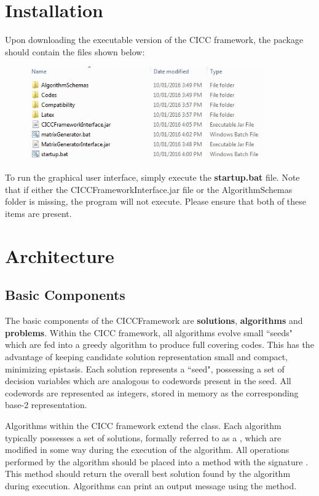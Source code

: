 \documentclass[titlepage]{article}
\begin{document}
\section{Installation}

Upon downloading the executable version of the CICC framework, the package should contain the files shown below:

\begin{figure}[H]
\centering
\includegraphics[width=100mm]{Images/Installation.png}
\end{figure}

To run the graphical user interface, simply execute the \textbf{startup.bat} file. Note that if either the CICCFrameworkInterface.jar file or the AlgorithmSchemas folder is missing, the program will not execute. Please ensure that both of these items are present.

\section{Architecture}

\subsection{Basic Components}

The basic components of the CICCFramework are \textbf{solutions}, \textbf{algorithms} and \textbf{problems}. Within the CICC framework, all algorithms evolve small ``seeds" which are fed into a greedy algorithm to produce full covering codes. This has the advantage of keeping candidate solution representation small and compact, minimizing epistasis. Each solution represents a ``seed", possessing a set of decision variables which are analogous to codewords present in the seed. All codewords are represented as integers, stored in memory as the corresponding base-2 representation.

Algorithms within the CICC framework extend the  class. Each algorithm typically possesses a set of solutions, formally referred to as a , which are modified in some way during the execution of the algorithm. All operations performed by the algorithm should be placed into a method with the signature . This method should return the overall best solution found by the algorithm during execution. Algorithms can print an output message using the  method.
\end{document}
